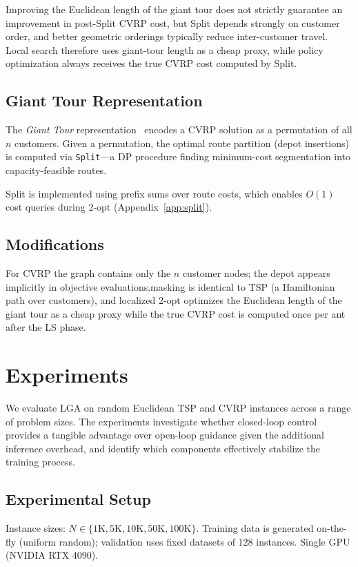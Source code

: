 \documentclass[sigconf,anonymous,review]{acmart}
\theoremstyle{definition}
\theoremstyle{plain}
\newcommand{\TSP}{\textsc{TSP}}
\newcommand{\CVRP}{\textsc{CVRP}}
\newcommand{\LGA}{\textsc{LGA}}
\begin{document}
Improving the Euclidean length of the giant tour does not strictly guarantee an improvement in post-Split CVRP cost, but Split depends strongly on customer order, and better geometric orderings typically reduce inter-customer travel.
Local search therefore uses giant-tour length as a cheap proxy, while policy optimization always receives the true CVRP cost computed by Split.

\subsection{Giant Tour Representation}
The \emph{Giant Tour} representation~\cite{prins2004} encodes a \CVRP{} solution as a permutation of all $n$ customers.
Given a permutation, the optimal route partition (depot insertions) is computed via \texttt{Split}---a DP procedure finding minimum-cost segmentation into capacity-feasible routes.

Split is implemented using prefix sums over route costs, which enables $O(1)$ cost queries during 2-opt (Appendix~\ref{app:split}).

\subsection{Modifications}
For CVRP the graph contains only the $n$ customer nodes; the depot appears implicitly in objective evaluations.\nFeasibility masking is identical to TSP (a Hamiltonian path over customers), and localized 2-opt optimizes the Euclidean length of the giant tour as a cheap proxy while the true CVRP cost is computed once per ant after the LS phase.

\section{Experiments}
\label{sec:experiments}

We evaluate \LGA{} on random Euclidean \TSP{} and \CVRP{} instances across a range of problem sizes.
The experiments investigate whether closed-loop control provides a tangible advantage over open-loop guidance given the additional inference overhead, and identify which components effectively stabilize the training process.

\subsection{Experimental Setup}
Instance sizes: $N \in \{1\text{K}, 5\text{K}, 10\text{K}, 50\text{K}, 100\text{K}\}$.
Training data is generated on-the-fly (uniform random); validation uses fixed datasets of 128 instances.
Single GPU (NVIDIA RTX 4090).
\end{document}
